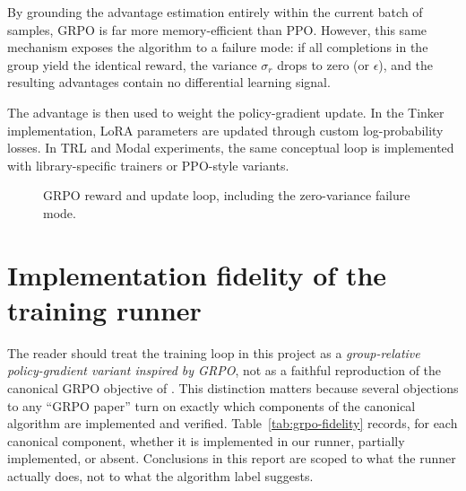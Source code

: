 \documentclass[12pt,a4paper]{report}
\newcommand{\fitdiagram}[1]{\resizebox{\textwidth}{!}{}}
\begin{document}
By grounding the advantage estimation entirely within the current batch of samples, GRPO is far more memory-efficient than PPO. However, this same mechanism exposes the algorithm to a failure mode: if all completions in the group yield the identical reward, the variance $\sigma_r$ drops to zero (or $\epsilon$), and the resulting advantages contain no differential learning signal.

The advantage is then used to weight the policy-gradient update. In the Tinker implementation, LoRA parameters are updated through custom log-probability losses. In TRL and Modal experiments, the same conceptual loop is implemented with library-specific trainers or PPO-style variants.

\begin{figure}[ht]
  \centering
  \fitdiagram{tikz/grpo_loop.tex}
  \caption{GRPO reward and update loop, including the zero-variance failure mode.}
  \label{fig:grpo-loop}
\end{figure}

\section{Implementation fidelity of the training runner}
\label{sec:grpo-fidelity}

The reader should treat the training loop in this project as a \emph{group-relative policy-gradient variant inspired by GRPO}, not as a faithful reproduction of the canonical GRPO objective of \citet{shao2024deepseekmath}. This distinction matters because several objections to any ``GRPO paper'' turn on exactly which components of the canonical algorithm are implemented and verified. Table~\ref{tab:grpo-fidelity} records, for each canonical component, whether it is implemented in our runner, partially implemented, or absent. Conclusions in this report are scoped to what the runner actually does, not to what the algorithm label suggests.
\end{document}
